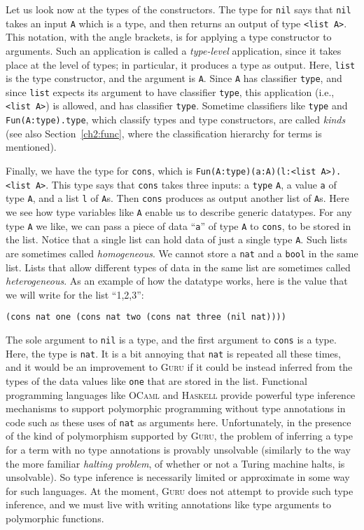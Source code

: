 \documentclass{book}[12pt]
\newcommand{\guru}[0]{\textsc{Guru}\xspace}
\begin{document}
Let us look now at the types of the constructors.  The type for
\texttt{nil} says that \texttt{nil} takes an input \texttt{A} which is
a type, and then returns an output of type \texttt{<list A>}.  This
notation, with the angle brackets, is for applying a type constructor
to arguments.  Such an application is called a \emph{type-level}
application, since it takes place at the level of types; in
particular, it produces a type as output.  Here, \texttt{list} is the
type constructor, and the argument is \texttt{A}.  Since \texttt{A}
has classifier \texttt{type}, and since \texttt{list} expects its
argument to have classifier \texttt{type}, this application (i.e.,
\texttt{<list A>}) is allowed, and has classifier \texttt{type}.
Sometime classifiers like \texttt{type} and \texttt{Fun(A:type).type},
which classify types and type constructors, are called \emph{kinds}
(see also Section~\ref{ch2:func}, where the classification hierarchy
for terms is mentioned).

Finally, we have the type for \texttt{cons}, which is
\texttt{Fun(A:type)(a:A)(l:<list A>).<list A>}.  This type says that
\texttt{cons} takes three inputs: a \texttt{type} \texttt{A}, a value
\texttt{a} of type \texttt{A}, and a list \texttt{l} of \texttt{A}s.
Then \texttt{cons} produces as output another list of \texttt{A}s.
Here we see how type variables like \texttt{A} enable us to describe
generic datatypes.  For any type \texttt{A} we like, we can pass a
piece of data ``\texttt{a}'' of type \texttt{A} to \texttt{cons}, to
be stored in the list.  Notice that a single list can hold data of
just a single type \texttt{A}.  Such lists are sometimes called
\emph{homogeneous}.  We cannot store a \texttt{nat} and a
\texttt{bool} in the same list.  Lists that allow different types of
data in the same list are sometimes called \emph{heterogeneous}.  As
an example of how the datatype works, here is the value that we will
write for the list ``1,2,3'':

\begin{verbatim}
(cons nat one (cons nat two (cons nat three (nil nat))))
\end{verbatim}

\noindent The sole argument to \texttt{nil} is a type, and the first
argument to \texttt{cons} is a type.  Here, the type is \texttt{nat}.
It is a bit annoying that \texttt{nat} is repeated all these times,
and it would be an improvement to \guru if it could be instead
inferred from the types of the data values like \texttt{one} that are
stored in the list.  Functional programming languages like
\textsc{OCaml} and \textsc{Haskell} provide powerful type inference
mechanisms to support polymorphic programming without type annotations
in code such as these uses of \texttt{nat} as arguments here.
Unfortunately, in the presence of the kind of polymorphism supported
by \guru, the problem of inferring a type for a term with no type
annotations is provably unsolvable (similarly to the way the more
familiar \emph{halting problem}, of whether or not a Turing machine
halts, is unsolvable).  So type inference is necessarily limited or
approximate in some way for such languages.  At the moment, \guru does
not attempt to provide such type inference, and we must live with
writing annotations like type arguments to polymorphic functions.
\end{document}
